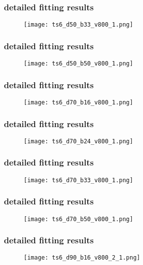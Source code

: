 	\begin{frame}
		\frametitle{\appendixname{} \textendash{} detailed fitting results}
		\begin{figure}
			\texttt{[image: ts6\_d50\_b33\_v800\_1.png]}
		\end{figure}
	\end{frame}

	\begin{frame}
		\frametitle{\appendixname{} \textendash{} detailed fitting results}
		\begin{figure}
			\texttt{[image: ts6\_d50\_b50\_v800\_1.png]}
		\end{figure}
	\end{frame}

	\begin{frame}
		\frametitle{\appendixname{} \textendash{} detailed fitting results}
		\begin{figure}
			\texttt{[image: ts6\_d70\_b16\_v800\_1.png]}
		\end{figure}
	\end{frame}

	\begin{frame}
		\frametitle{\appendixname{} \textendash{} detailed fitting results}
		\begin{figure}
			\texttt{[image: ts6\_d70\_b24\_v800\_1.png]}
		\end{figure}
	\end{frame}

	\begin{frame}
		\frametitle{\appendixname{} \textendash{} detailed fitting results}
		\begin{figure}
			\texttt{[image: ts6\_d70\_b33\_v800\_1.png]}
		\end{figure}
	\end{frame}

	\begin{frame}
		\frametitle{\appendixname{} \textendash{} detailed fitting results}
		\begin{figure}
			\texttt{[image: ts6\_d70\_b50\_v800\_1.png]}
		\end{figure}
	\end{frame}

	\begin{frame}
		\frametitle{\appendixname{} \textendash{} detailed fitting results}
		\begin{figure}
			\texttt{[image: ts6\_d90\_b16\_v800\_2\_1.png]}
		\end{figure}
	\end{frame}

